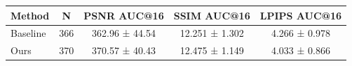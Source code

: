 \begin{tabular}{lcccc}
\toprule
Method & N & PSNR AUC@16 & SSIM AUC@16 & LPIPS AUC@16 \\
\midrule
Baseline & 366 & 362.96 ± 44.54 & 12.251 ± 1.302 & 4.266 ± 0.978 \\
Ours & 370 & 370.57 ± 40.43 & 12.475 ± 1.149 & 4.033 ± 0.866 \\
\bottomrule
\end{tabular}
